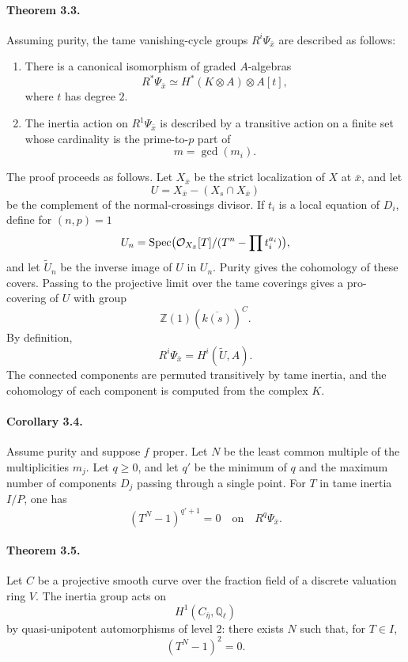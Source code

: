 \documentclass[11pt]{article}
\theoremstyle{plain}
\theoremstyle{definition}
\theoremstyle{remark}
\newcommand{\QQ}{\mathbb Q}
\newcommand{\ZZ}{\mathbb Z}
\DeclareMathOperator{\Spec}{Spec}
\begin{document}
\paragraph{Theorem 3.3.}
Assuming purity, the tame vanishing-cycle groups $R^i\Psi_{\bar x}$ are described as follows:
\begin{enumerate}[label=\roman*)]
\item There is a canonical isomorphism of graded $A$-algebras
\[
R^*\Psi_{\bar x}\simeq H^*(K\otimes A)\otimes A[t],
\]
where $t$ has degree $2$.
\item The inertia action on $R^1\Psi_{\bar x}$ is described by a transitive action on a finite set whose cardinality is the prime-to-$p$ part of
\[
m=\gcd(m_i).
\]
\end{enumerate}

The proof proceeds as follows. Let $X_{\bar x}$ be the strict localization of $X$ at $\bar x$, and let
\[
U=X_{\bar x}-(X_s\cap X_{\bar x})
\]
be the complement of the normal-crossings divisor. If $t_i$ is a local equation of $D_i$, define for $(n,p)=1$
\[
U_n=\Spec\bigl(\cO_{X_{\bar x}}[T]/(T^n-\prod t_i^{a_i})\bigr),
\]
and let $\widetilde U_n$ be the inverse image of $U$ in $U_n$. Purity gives the cohomology of these covers. Passing to the projective limit over the tame coverings gives a pro-covering of $U$ with group
\[
\ZZ(1)(\overline{k(s)})^C.
\]
By definition,
\[
R^i\Psi_{\bar x}=H^i(\widetilde U,A).
\]
The connected components are permuted transitively by tame inertia, and the cohomology of each component is computed from the complex $K$.

\paragraph{Corollary 3.4.}
Assume purity and suppose $f$ proper. Let $N$ be the least common multiple of the multiplicities $m_j$. Let $q\geq0$, and let $q'$ be the minimum of $q$ and the maximum number of components $D_j$ passing through a single point. For $T$ in tame inertia $I/P$, one has
\[
(T^N-1)^{q'+1}=0
\quad\text{on}\quad
R^q\Psi_{\bar x}.
\]

\paragraph{Theorem 3.5.}
Let $C$ be a projective smooth curve over the fraction field of a discrete valuation ring $V$. The inertia group acts on
\[
H^1(C_{\bar\eta},\QQ_\ell)
\]
by quasi-unipotent automorphisms of level $2$: there exists $N$ such that, for $T\in I$,
\[
(T^N-1)^2=0.
\]
\end{document}
